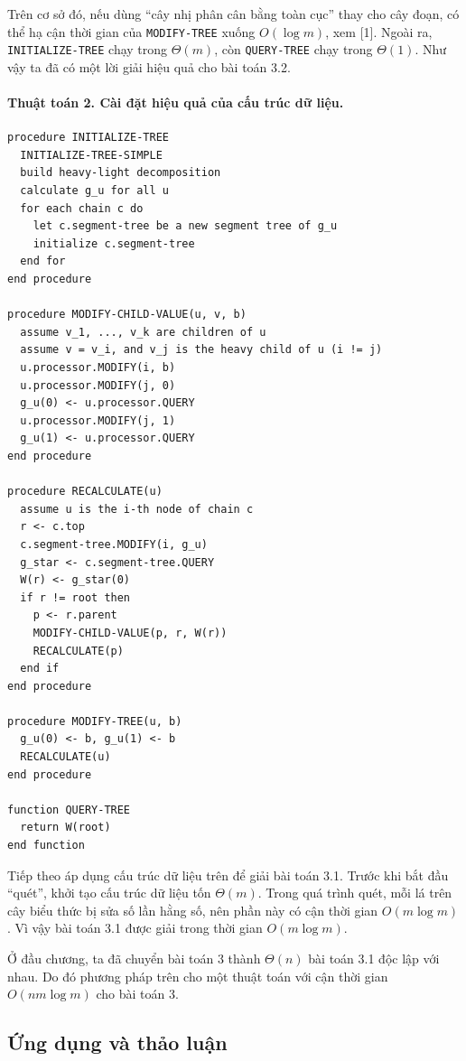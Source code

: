 \documentclass[11pt]{article}
\begin{document}
Trên cơ sở đó, nếu dùng ``cây nhị phân cân bằng toàn cục'' thay cho cây đoạn,
có thể hạ cận thời gian của \texttt{MODIFY-TREE} xuống \(O(\log m)\), xem [1].
Ngoài ra, \texttt{INITIALIZE-TREE} chạy trong \(\Theta(m)\), còn
\texttt{QUERY-TREE} chạy trong \(\Theta(1)\). Như vậy ta đã có một lời giải
hiệu quả cho bài toán 3.2.

\paragraph{Thuật toán 2. Cài đặt hiệu quả của cấu trúc dữ liệu.}

\begin{verbatim}
procedure INITIALIZE-TREE
  INITIALIZE-TREE-SIMPLE
  build heavy-light decomposition
  calculate g_u for all u
  for each chain c do
    let c.segment-tree be a new segment tree of g_u
    initialize c.segment-tree
  end for
end procedure

procedure MODIFY-CHILD-VALUE(u, v, b)
  assume v_1, ..., v_k are children of u
  assume v = v_i, and v_j is the heavy child of u (i != j)
  u.processor.MODIFY(i, b)
  u.processor.MODIFY(j, 0)
  g_u(0) <- u.processor.QUERY
  u.processor.MODIFY(j, 1)
  g_u(1) <- u.processor.QUERY
end procedure

procedure RECALCULATE(u)
  assume u is the i-th node of chain c
  r <- c.top
  c.segment-tree.MODIFY(i, g_u)
  g_star <- c.segment-tree.QUERY
  W(r) <- g_star(0)
  if r != root then
    p <- r.parent
    MODIFY-CHILD-VALUE(p, r, W(r))
    RECALCULATE(p)
  end if
end procedure

procedure MODIFY-TREE(u, b)
  g_u(0) <- b, g_u(1) <- b
  RECALCULATE(u)
end procedure

function QUERY-TREE
  return W(root)
end function
\end{verbatim}

Tiếp theo áp dụng cấu trúc dữ liệu trên để giải bài toán 3.1. Trước khi bắt
đầu ``quét'', khởi tạo cấu trúc dữ liệu tốn \(\Theta(m)\). Trong quá trình
quét, mỗi lá trên cây biểu thức bị sửa số lần hằng số, nên phần này có cận
thời gian \(O(m\log m)\). Vì vậy bài toán 3.1 được giải trong thời gian
\(O(m\log m)\).

Ở đầu chương, ta đã chuyển bài toán 3 thành \(\Theta(n)\) bài toán 3.1 độc lập
với nhau. Do đó phương pháp trên cho một thuật toán với cận thời gian
\(O(nm\log m)\) cho bài toán 3.

\subsection{Ứng dụng và thảo luận}
\end{document}
